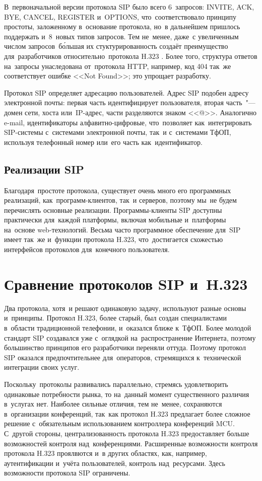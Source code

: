 В~первоначальной версии протокола SIP было всего 6~запросов: INVITE, ACK, BYE, CANCEL, REGISTER и~OPTIONS, что~соответствовало принципу простоты, заложенному в~основание протокола, но~в дальнейшем пришлось поддержать и~8~новых типов запросов.
Тем не~менее, даже~с увеличенным числом запросов~б\'{о}льшая их стуктурированность создаёт преимущество для~разработчиков относительно~протокола H.323 .
Более того, структура ответов на~запросы унаследована от~протокола HTTP, например, код 404 так~же соответствует ошибке <<Not Found>>; это упрощает разработку.

Протокол SIP определяет адресацию пользователей.
Адрес SIP подобен адресу электронной почты: первая часть идентифицирует пользователя, вторая часть~"--- домен сети, хоста или~IP-адрес, части разделяются знаком <<@>>.
Аналогично e-mail, идентификаторы алфавитно-цифровые, что~позволяет как~интегрировать SIP-системы с~системами электронной почты, так~и с~системами ТфОП, используя телефонный номер или~его часть как~идентификатор.

\subsection{Реализации SIP}

Благодаря~простоте протокола, существует очень много его программных реализаций, как~программ-клиентов, так~и серверов, поэтому мы~не будем перечислять основные реализации.
Программы-клиенты SIP доступны практически для~каждой платформы, включая мобильные и~платформы на~основе web-технологий.
Весьма часто программное обеспечение для~SIP имеет так~же и~функции протокола H.323, что~достигается схожестью интерфейсов протоколов для~конечного пользователя.

\section{Сравнение протоколов SIP и~H.323}

Два протокола, хотя~и решают одинаковую задачу, используют разные основы и~принципы.
Протокол H.323, более старый, был создан специалистами в~области традиционной телефонии, и~оказался ближе к~ТфОП.
Более молодой стандарт SIP создавался уже с~оглядкой на~распространение Интернета, поэтому большинство принципов его разработчики переняли оттуда.
Поэтому протокол SIP оказался предпочтительнее для~операторов, стремящихся к~технической интеграции своих услуг.

Поскольку~протоколы развивались параллельно, стремясь удовлетворить одинаковые потребности рынка, то на~данный момент существенного различия в~услугах нет.
Наиболее сильные отличия, тем не~менее, сохраняются в~организации конференций, так~как протокол H.323 предлагает более сложное решение с~обязательным использованием контроллера конференций MCU.
С~другой стороны, централизованность протокола H.323 предоставляет больше возможностей контроля над~конференциями.
Расширенные возможности контроля протокола H.323 проялвются и~в других областях, как, например, аутентификации и~учёта пользователей, контроль над~ресурсами.
Здесь возможности протокола SIP ограничены.

